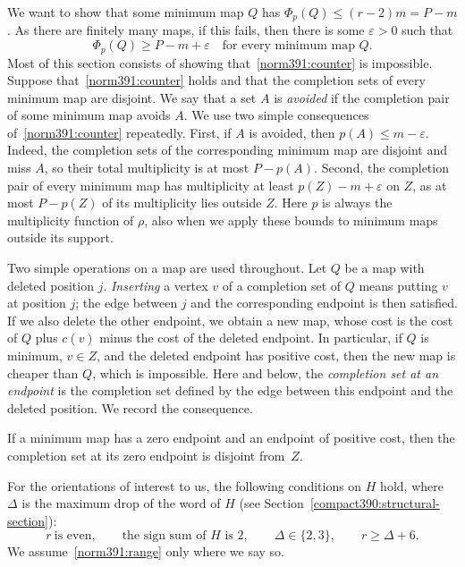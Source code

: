 We want to show that some minimum map $Q$ has $\Phi_p(Q)\le(r-2)m=P-m$. As there are finitely many maps, if this fails, then there is some $\varepsilon>0$ such that
\begin{equation}\label{norm391:counter}
 \Phi_p(Q)\ge P-m+\varepsilon\quad\text{for every minimum map }Q.
\end{equation}
Most of this section consists of showing that~\eqref{norm391:counter} is impossible.
Suppose that~\eqref{norm391:counter} holds and that the completion sets of every minimum map are disjoint. We say that a set $A$ is \emph{avoided} if the completion pair of some minimum map avoids $A$. We use two simple consequences of~\eqref{norm391:counter} repeatedly. First, if $A$ is avoided, then $p(A)\le m-\varepsilon$. Indeed, the completion sets of the corresponding minimum map are disjoint and miss $A$, so their total multiplicity is at most $P-p(A)$. Second, the completion pair of every minimum map has multiplicity at least $p(Z)-m+\varepsilon$ on $Z$, as at most $P-p(Z)$ of its multiplicity lies outside $Z$.
Here $p$ is always the multiplicity function of $\rho$, also when we apply these bounds to minimum maps outside its support.

Two simple operations on a map are used throughout. Let $Q$ be a map with deleted position $j$. \emph{Inserting} a vertex $v$ of a completion set of $Q$ means putting $v$ at position $j$; the edge between $j$ and the corresponding endpoint is then satisfied. If we also delete the other endpoint, we obtain a new map, whose cost is the cost of $Q$ plus $c(v)$ minus the cost of the deleted endpoint. In particular, if $Q$ is minimum, $v\in Z$, and the deleted endpoint has positive cost, then the new map is cheaper than $Q$, which is impossible. Here and below, the \emph{completion set at an endpoint} is the completion set defined by the edge between this endpoint and the deleted position. We record the consequence.

\begin{observation}\label{insertion:rule}
If a minimum map has a zero endpoint and an endpoint of positive cost, then the completion set at its zero endpoint is disjoint from~$Z$.
\end{observation}

For the orientations of interest to us, the following conditions on $H$ hold, where $\Delta$ is the maximum drop of the word of $H$ (see Section~\ref{compact390:structural-section}):
\begin{equation}\label{norm391:range}
 r\ \text{is even},\qquad \text{the sign sum of }H\text{ is }2,\qquad
 \Delta\in\{2,3\},\qquad r\ge\Delta+6.
\end{equation}
We assume~\eqref{norm391:range} only where we say so.


